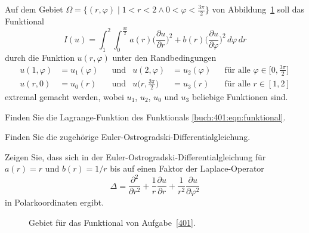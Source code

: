 Auf dem Gebiet
$\Omega = \{ (r,\varphi) \mid 1<r<2\wedge 0<\varphi<\frac{3\pi}{2} \}$
von Abbildung~\ref{buch:401:fig:domain} soll das Funktional
\begin{equation}
I(u)
=
\int_1^2 \int_0^\frac{3\pi}2
a(r)
\biggl(\frac{\partial u}{\partial r}\biggr)^2
+
b(r)
\biggl(\frac{\partial u}{\partial \varphi}\biggr)^2
\,d\varphi\,dr
\label{buch:401:eqn:funktional}
\end{equation}
durch die Funktion $u(r,\varphi)$
unter den
Randbedingungen 
\begin{equation*}
\begin{aligned}
u(1,\varphi)&=u_1(\varphi)&&\text{und}&
u(2,\varphi)&=u_2(\varphi)&&\text{für alle }\varphi\in\biggl[0,\frac{3\pi}2\biggr]
\\
u(r,0)&=u_0(r)&&\text{und}&
u\biggl(r,\frac{3\pi}2\biggr)&=u_3(r)&&\text{für alle }r\in[1,2]
\end{aligned}
\label{buch:401:eqn:rb}
\end{equation*}
extremal gemacht werden,
wobei $u_1$, $u_2$, $u_0$ und $u_3$ beliebige Funktionen sind.
\begin{teilaufgaben}
\item
Finden Sie die Lagrange-Funktion des Funktionals
\eqref{buch:401:eqn:funktional}.
\item
Finden Sie die zugehörige Euler-Ostrogradski-Differentialgleichung.
\item
Zeigen Sie, dass sich in der Euler-Ostrogradski-Differentialgleichung
für $a(r)=r$ und $b(r)=1/r$ bis auf einen Faktor der Laplace-Operator
\[
\Delta
=
\frac{\partial^2}{\partial r^2}
+
\frac{1}{r}\frac{\partial u}{\partial r}
+
\frac{1}{r^2}\frac{\partial u}{\partial\varphi^2}
\]
in Polarkoordinaten ergibt.
\end{teilaufgaben}
\begin{figure}[h]
\centering
\def\r{3}
\def\w{55}
\def\wmax{135}
\caption{Gebiet für das Funktional von Aufgabe~\ref{401}.
\label{buch:401:fig:domain}}
\end{figure}


